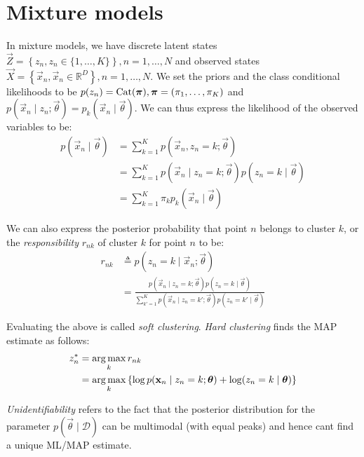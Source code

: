 \section{Mixture models}
In mixture models, we have discrete latent states $\vec Z = \left\{z_n, z_n \in \{1, \dotsc, K\}\right\}, n = 1, \dotsc, N$ and observed states $\vec X = \left\{\vec x_n, \vec x_n \in \mathbb R^D\right\}, n = 1, \dotsc, N$. We set the priors and the class conditional likelihoods to be $p(z_n) = \operatorname{Cat}(\boldsymbol{\mathbf{\pi}}), \boldsymbol{\mathbf{\pi}} = (\pi_1, \dotsc, \pi_K)$ and $p(\vec x_n \mid z_n; \vec \theta) = p_k(\vec x_n \mid \vec \theta)$. We can thus express the likelihood of the observed variables to be:
\begin{align}
    p(\vec x_n \mid \vec \theta)    &= \sum_{k = 1}^K p(\vec x_n, z_n = k; \vec \theta) \nonumber\\
                                    &= \sum_{k = 1}^K p(\vec x_n \mid z_n = k; \vec \theta) p(z_n = k \mid \vec \theta) \nonumber\\
                                    &= \sum_{k = 1}^K \pi_k p_k(\vec x_n \mid \vec \theta) \label{eqn:models-mm-lik}
\end{align}

We can also express the posterior probability that point $n$ belongs to cluster $k$, or the \emph{responsibility} $r_{nk}$ of cluster $k$ for point $n$ to be:
\begin{align}
    r_{nk}  &\triangleq p(z_n = k \mid \vec x_n; \vec \theta) \nonumber\\
            &= \frac{p(\vec x_n \mid z_n = k; \vec \theta) p(z_n = k \mid \vec \theta)}{\sum_{k' = 1}^K p(\vec x_n \mid z_n = k'; \vec \theta) p(z_n = k' \mid \vec \theta)}
\end{align}

Evaluating the above is called \emph{soft clustering}. \emph{Hard clustering} finds the MAP estimate as follows:
\begin{align}
    z_n^\ast    &= \operatorname*{arg\,max}_k r_{nk} \nonumber\\
                &= \operatorname*{arg\,max}_k \left\{\log p(\boldsymbol{\mathbf{x}}_n \mid z_n = k; \boldsymbol{\mathbf{\theta}}) + \log(z_n = k \mid \boldsymbol{\mathbf{\theta}})\right\}
\end{align}

\emph{Unidentifiability} refers to the fact that the posterior distribution for the parameter $p(\vec \theta \mid \mathcal D)$ can be multimodal (with equal peaks) and hence cant find a unique ML/MAP estimate.


